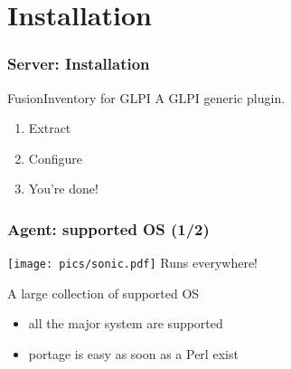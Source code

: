 \documentclass{beamer}
\begin{document}
\section{Installation}

\begin{frame}
    \frametitle{Server: Installation}

    \begin{block}{FusionInventory for GLPI}
        A GLPI generic plugin.
        \begin{enumerate}
            \item Extract
            \item Configure
            \item You're done!
        \end{enumerate}
    \end{block}

\end{frame}

\begin{frame}
    \frametitle{Agent: supported OS (1/2)}

    \texttt{[image: pics/sonic.pdf]}
    Runs everywhere!

    \pause

    \begin{block}{A large collection of supported OS}
        \begin{itemize}
            \item all the major system are supported
            \item portage is easy as soon as a Perl exist
        \end{itemize}
    \end{block}
\end{frame}
\end{document}

